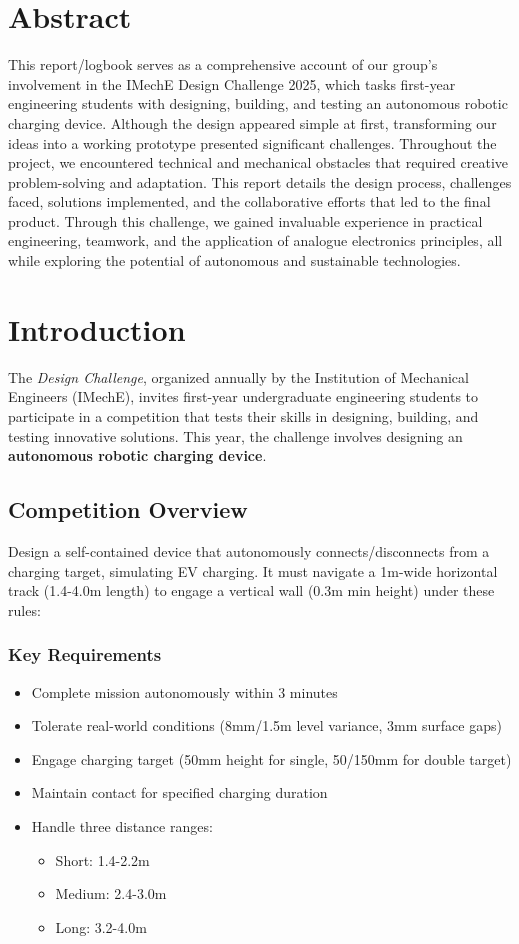 \documentclass{article}
\begin{document}
\section{Abstract}
This report/logbook serves as a comprehensive account of our group's involvement in the IMechE Design Challenge 2025, which tasks first-year engineering students with designing, building, and testing an autonomous robotic charging device. Although the design appeared simple at first, transforming our ideas into a working prototype presented significant challenges. Throughout the project, we encountered technical and mechanical obstacles that required creative problem-solving and adaptation. This report details the design process, challenges faced, solutions implemented, and the collaborative efforts that led to the final product. Through this challenge, we gained invaluable experience in practical engineering, teamwork, and the application of analogue electronics principles, all while exploring the potential of autonomous and sustainable technologies.

\newpage
\section{Introduction}
The \textit{Design Challenge}, organized annually by the Institution of Mechanical Engineers (IMechE), invites first-year undergraduate engineering students to participate in a competition that tests their skills in designing, building, and testing innovative solutions. This year, the challenge involves designing an \textbf{autonomous robotic charging device}. 
\subsection{Competition Overview}
Design a self-contained device that autonomously connects/disconnects from a charging target, simulating EV charging. It must navigate a 1m-wide horizontal track (1.4-4.0m length) to engage a vertical wall (0.3m min height) under these rules:
\subsubsection*{Key Requirements}
\begin{itemize}[itemsep=-0.5mm,topsep=0pt]
	\item Complete mission autonomously within 3 minutes
	\item Tolerate real-world conditions (8mm/1.5m level variance, 3mm surface gaps)
	\item Engage charging target (50mm height for single, 50/150mm for double target)
	\item Maintain contact for specified charging duration
	\item Handle three distance ranges:
	\begin{itemize}[noitemsep,topsep=0pt]
		\item Short: 1.4-2.2m
		\item Medium: 2.4-3.0m
		\item Long: 3.2-4.0m
	\end{itemize}
\end{itemize}
\end{document}
